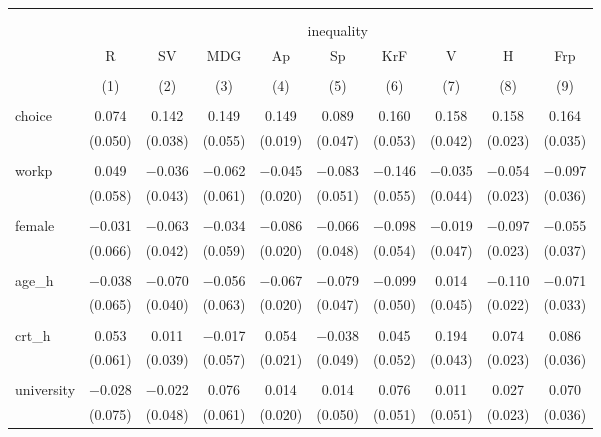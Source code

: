 
\begin{table}[!htbp] \centering 
  \caption{} 
  \label{} 
\begin{tabular}{@{\extracolsep{5pt}}lccccccccc} 
\\[-1.8ex]\hline 
\hline \\[-1.8ex] 
\\[-1.8ex] & \multicolumn{9}{c}{inequality} \\ 
 & R & SV & MDG & Ap & Sp & KrF & V & H & Frp \\ 
\\[-1.8ex] & (1) & (2) & (3) & (4) & (5) & (6) & (7) & (8) & (9)\\ 
\hline \\[-1.8ex] 
 choice & 0.074 & 0.142 & 0.149 & 0.149 & 0.089 & 0.160 & 0.158 & 0.158 & 0.164 \\ 
  & (0.050) & (0.038) & (0.055) & (0.019) & (0.047) & (0.053) & (0.042) & (0.023) & (0.035) \\ 
  & & & & & & & & & \\ 
 workp & 0.049 & $-$0.036 & $-$0.062 & $-$0.045 & $-$0.083 & $-$0.146 & $-$0.035 & $-$0.054 & $-$0.097 \\ 
  & (0.058) & (0.043) & (0.061) & (0.020) & (0.051) & (0.055) & (0.044) & (0.023) & (0.036) \\ 
  & & & & & & & & & \\ 
 female & $-$0.031 & $-$0.063 & $-$0.034 & $-$0.086 & $-$0.066 & $-$0.098 & $-$0.019 & $-$0.097 & $-$0.055 \\ 
  & (0.066) & (0.042) & (0.059) & (0.020) & (0.048) & (0.054) & (0.047) & (0.023) & (0.037) \\ 
  & & & & & & & & & \\ 
 age\_h & $-$0.038 & $-$0.070 & $-$0.056 & $-$0.067 & $-$0.079 & $-$0.099 & 0.014 & $-$0.110 & $-$0.071 \\ 
  & (0.065) & (0.040) & (0.063) & (0.020) & (0.047) & (0.050) & (0.045) & (0.022) & (0.033) \\ 
  & & & & & & & & & \\ 
 crt\_h & 0.053 & 0.011 & $-$0.017 & 0.054 & $-$0.038 & 0.045 & 0.194 & 0.074 & 0.086 \\ 
  & (0.061) & (0.039) & (0.057) & (0.021) & (0.049) & (0.052) & (0.043) & (0.023) & (0.036) \\ 
  & & & & & & & & & \\ 
 university & $-$0.028 & $-$0.022 & 0.076 & 0.014 & 0.014 & 0.076 & 0.011 & 0.027 & 0.070 \\ 
  & (0.075) & (0.048) & (0.061) & (0.020) & (0.050) & (0.051) & (0.051) & (0.023) & (0.036) \\ 

\end{tabular}
\end{table}
